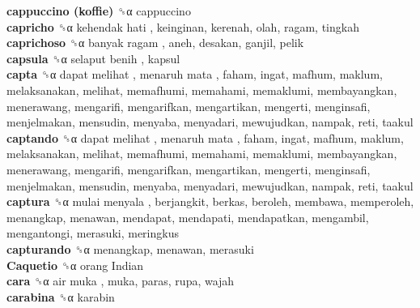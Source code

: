 \textbf{cappuccino (koffie)} ␝α  cappuccino  \\
\textbf{capricho} ␝α   kehendak hati , keinginan, kerenah, olah, ragam, tingkah  \\
\textbf{caprichoso} ␝α   banyak ragam , aneh, desakan, ganjil, pelik  \\
\textbf{capsula} ␝α   selaput benih , kapsul  \\
\textbf{capta} ␝α   dapat melihat ,  menaruh mata , faham, ingat, mafhum, maklum, melaksanakan, melihat, memafhumi, memahami, memaklumi, membayangkan, menerawang, mengarifi, mengarifkan, mengartikan, mengerti, menginsafi, menjelmakan, mensudin, menyaba, menyadari, mewujudkan, nampak, reti, taakul  \\
\textbf{captando} ␝α   dapat melihat ,  menaruh mata , faham, ingat, mafhum, maklum, melaksanakan, melihat, memafhumi, memahami, memaklumi, membayangkan, menerawang, mengarifi, mengarifkan, mengartikan, mengerti, menginsafi, menjelmakan, mensudin, menyaba, menyadari, mewujudkan, nampak, reti, taakul  \\
\textbf{captura} ␝α   mulai menyala , berjangkit, berkas, beroleh, membawa, memperoleh, menangkap, menawan, mendapat, mendapati, mendapatkan, mengambil, mengantongi, merasuki, meringkus  \\
\textbf{capturando} ␝α  menangkap, menawan, merasuki  \\
\textbf{Caquetio} ␝α   orang Indian   \\
\textbf{cara} ␝α   air muka , muka, paras, rupa, wajah  \\
\textbf{carabina} ␝α  karabin  \\
